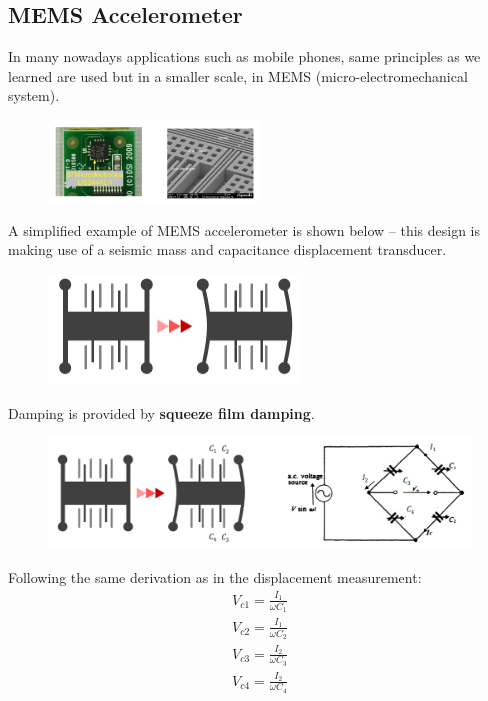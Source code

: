 \documentclass[class=report, crop=false, 12pt,a4paper]{standalone}
\begin{document}
\subsection{MEMS Accelerometer}
In many nowadays applications such as mobile phones, same principles as we learned are used but in a smaller scale, in MEMS (micro-electromechanical system).
\begin{figure}[H]
  \centering
  \includegraphics[width = 0.5\textwidth]{../img/Mdiagram40.png}
\end{figure}
A simplified example of MEMS accelerometer is shown below – this design is making use of a seismic mass and capacitance displacement transducer.
\begin{figure}[H]
  \centering
  \includegraphics[width = 0.6\textwidth]{../img/Mdiagram41.png}
\end{figure}
Damping is provided by \textbf{squeeze film damping}.
\begin{figure}[H]
  \centering
  \includegraphics[width = 1\textwidth]{../img/Mdiagram42.png}
\end{figure}
Following the same derivation as in the displacement measurement:
\begin{gather}
  V_{c1} = \frac{I_1}{\omega C_1} \\
  V_{c2} = \frac{I_1}{\omega C_2} \\
  V_{c3} = \frac{I_2}{\omega C_3} \\
  V_{c4} = \frac{I_2}{\omega C_4}
\end{gather}
\end{document}
